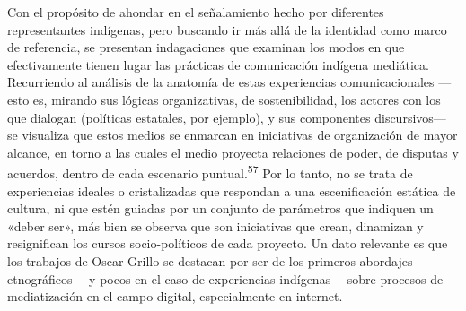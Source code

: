 \documentclass{tufte-handout}
\begin{document}
Con el propósito de ahondar en el señalamiento hecho por diferentes
representantes indígenas, pero buscando ir más allá de la identidad como
marco de referencia, se presentan indagaciones que examinan los modos en
que efectivamente tienen lugar las prácticas de comunicación indígena
mediática. Recurriendo al análisis de la anatomía de estas experiencias
comunicacionales ---esto es, mirando sus lógicas organizativas, de
sostenibilidad, los actores con los que dialogan (políticas estatales,
por ejemplo), y sus componentes discursivos--- se visualiza que estos
medios se enmarcan en iniciativas de organización de mayor alcance, en
torno a las cuales el medio proyecta relaciones de poder, de disputas y
acuerdos, dentro de cada escenario puntual.\textsuperscript{57} Por lo tanto, no se trata de experiencias
ideales o cristalizadas que respondan a una escenificación estática de
cultura, ni que estén guiadas por un conjunto de parámetros que indiquen
un «deber ser», más bien se observa que son iniciativas que crean,
dinamizan y resignifican los cursos socio-políticos de cada proyecto. Un
dato relevante es que los trabajos de Oscar Grillo se destacan por ser
de los primeros abordajes etnográficos ---y pocos en el caso de
experiencias indígenas--- sobre procesos de mediatización en el campo
digital, especialmente en internet.
\end{document}
